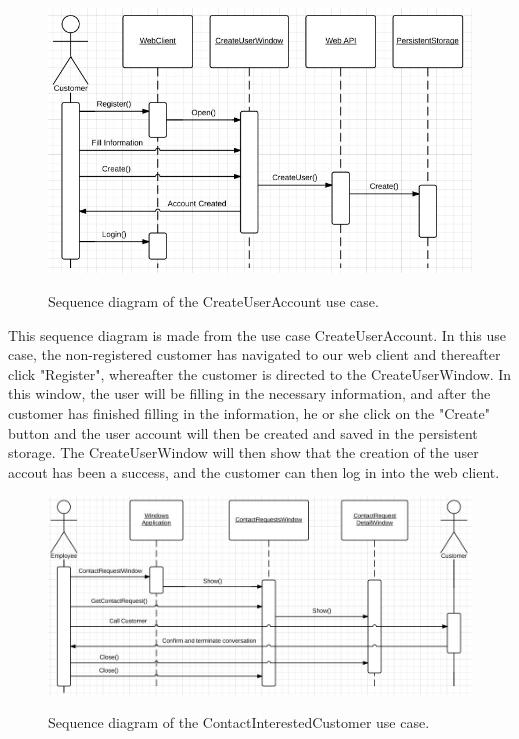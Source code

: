 \begin{figure}[H]
	\centering
		\includegraphics[width=\textwidth]{Figures/SequenceDiagram-CreateUserAccount}\\
	\caption{Sequence diagram of the CreateUserAccount use case.}
  \label{fig:SequenceDiagram-CreateUserAccount}
\end{figure}

This sequence diagram is made from the use case CreateUserAccount. 
In this use case, the non-registered customer has navigated to our web client and thereafter click "Register", whereafter the customer is directed to the CreateUserWindow. In this window, the user will be filling in the necessary information, and after the customer has finished filling in the information, he or she click on the "Create" button and the user account will then be created and saved in the persistent storage. The CreateUserWindow will then show that the creation of the user accout has been a success, and the customer can then log in into the web client.

\begin{figure}[H]
	\centering
		\includegraphics[width=\textwidth]{Figures/SequenceDiagram-ContactInterestedCustomer}\\
	\caption{Sequence diagram of the ContactInterestedCustomer use case.}
  \label{fig:SequenceDiagram-ContactInterestedCustomer}
\end{figure}

